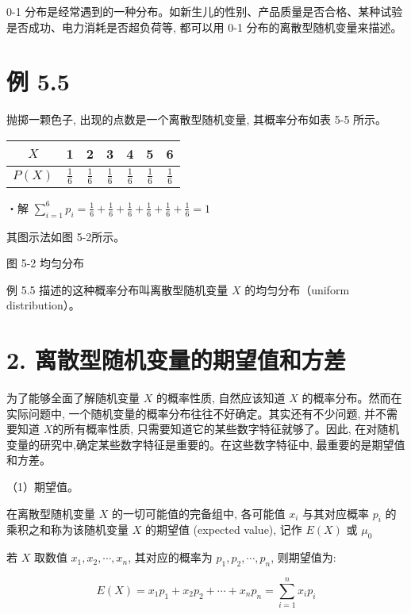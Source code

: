 \documentclass[10pt]{article}
\begin{document}
\begin{CJK*}{UTF8}{bsmi}
0-1 分布是经常遇到的一种分布。如新生儿的性别、产品质量是否合格、某种试验是否成功、电力消耗是否超负荷等, 都可以用 0-1 分布的离散型随机变量来描述。

\section*{例 5.5}
抛掷一颗色子, 出现的点数是一个离散型随机变量, 其概率分布如表 5-5 所示。

\begin{center}
\begin{tabular}{ccccccc}
\hline
$X$ & 1 & 2 & 3 & 4 & 5 & 6 \\
\hline
$P(X)$ & $\frac{1}{6}$ & $\frac{1}{6}$ & $\frac{1}{6}$ & $\frac{1}{6}$ & $\frac{1}{6}$ & $\frac{1}{6}$ \\
\hline
\end{tabular}
\end{center}

・解 $\sum_{i=1}^{6} p_{i}=\frac{1}{6}+\frac{1}{6}+\frac{1}{6}+\frac{1}{6}+\frac{1}{6}+\frac{1}{6}=1$

其图示法如图 5-2所示。

\begin{center}
\end{center}

图 5-2 均匀分布

例 5.5 描述的这种概率分布叫离散型随机变量 $X$ 的均匀分布（uniform distribution）。

\section*{2. 离散型随机变量的期望值和方差}
为了能够全面了解随机变量 $X$ 的概率性质, 自然应该知道 $X$ 的概率分布。然而在实际问题中, 一个随机变量的概率分布往往不好确定。其实还有不少问题, 并不需要知道 $X$的所有概率性质, 只需要知道它的某些数字特征就够了。因此, 在对随机变量的研究中,确定某些数字特征是重要的。在这些数字特征中, 最重要的是期望值和方差。

（1）期望值。

在离散型随机变量 $X$ 的一切可能值的完备组中, 各可能值 $x_{i}$ 与其对应概率 $p_{i}$ 的乘积之和称为该随机变量 $X$ 的期望值 (expected value), 记作 $E(X)$ 或 $\mu_{0}$

若 $X$ 取数值 $x_{1}, x_{2}, \cdots, x_{n}$, 其对应的概率为 $p_{1}, p_{2}, \cdots, p_{n}$, 则期望值为:


\begin{equation*}
E(X)=x_{1} p_{1}+x_{2} p_{2}+\cdots+x_{n} p_{n}=\sum_{i=1}^{n} x_{i} p_{i} \tag{5.3}
\end{equation*}



\end{CJK*}
\end{document}
